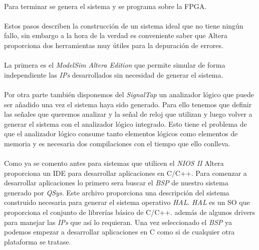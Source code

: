 \documentclass[a4paper,12pt,titlepage,final]{book}
\begin{document}
\paragraph{}
Para terminar se genera el sistema y se programa sobre la FPGA.

\paragraph{}
Estos pasos describen la construcción de un sistema ideal que no tiene ningún fallo, sin embargo a la hora de la verdad es conveniente saber que Altera proporciona dos herramientas muy útiles para la depuración de errores. 

\paragraph{}
La primera es el \textit{ModelSim Altera Edition} que permite simular de forma independiente las \textit{IPs} desarrollados sin necesidad de generar el sistema.

\paragraph{}
Por otra parte también disponemos del \textit{SignalTap} un analizador lógico que puede ser añadido una vez el sistema haya sido generado. Para ello tenemos que definir las señales que queremos analizar y la señal de reloj que utilizan y luego volver a generar el sistema con el analizador lógico integrado. Esto tiene el problema de que el analizador lógico consume tanto elementos lógicos como elementos de memoria y es necesaria dos compilaciones con el tiempo que ello conlleva.

\paragraph{}
Como ya se comento antes para sistemas que utilicen el \textit{NIOS II} Altera proporciona un IDE para desarrollar aplicaciones en C/C++. Para comenzar a desarrollar aplicaciones lo primero sera buscar el \textit{BSP} de nuestro sistema generado por \textit{QSys}. Este archivo proporciona una descripción del sistema construido necesaria para generar el sistema operativo \textit{HAL}. \textit{HAL} es un SO que proporciona el conjunto de librerías básico de C/C++. además de algunos drivers para manejar las \textit{IPs} que así lo requieran. Una vez seleccionado el \textit{BSP} ya podemos empezar a desarrollar aplicaciones en C como si de cualquier otra plataforma se tratase.
\end{document}
